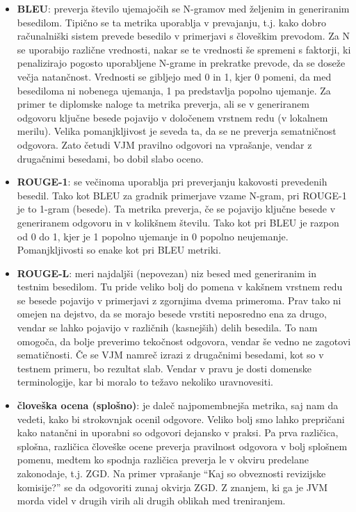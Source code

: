 \documentclass[a4paper,12pt,openright]{book}
\begin{document}
\begin{itemize}
    \item \textbf{BLEU}: preverja število ujemajočih se N-gramov med željenim in generiranim besedilom. Tipično se ta metrika uporablja v prevajanju, t.j. kako dobro računalniški sistem prevede besedilo v primerjavi s človeškim prevodom. Za N se uporabijo različne vrednosti, nakar se te vrednosti še spremeni s faktorji, ki penalizirajo pogosto uporabljene N-grame in prekratke prevode, da se doseže večja natančnost. Vrednosti se gibljejo med 0 in 1, kjer 0 pomeni, da med besediloma ni nobenega ujemanja, 1 pa predstavlja popolno ujemanje. Za primer te diplomske naloge ta metrika preverja, ali se v generiranem odgovoru ključne besede pojavijo v določenem vrstnem redu (v lokalnem merilu). Velika pomanjkljivost je seveda ta, da se ne preverja sematničnost odgovora. Zato četudi VJM pravilno odgovori na vprašanje, vendar z drugačnimi besedami, bo dobil slabo oceno.
    \item \textbf{ROUGE-1}: se večinoma uporablja pri preverjanju kakovosti prevedenih besedil. Tako kot BLEU za gradnik primerjave vzame N-gram, pri ROUGE-1 je to 1-gram (besede). Ta metrika preverja, če se pojavijo ključne besede v generiranem odgovoru in v kolikšnem številu. Tako kot pri BLEU je razpon od 0 do 1, kjer je 1 popolno ujemanje in 0 popolno neujemanje. Pomanjkljivosti so enake kot pri BLEU metriki.
    \item \textbf{ROUGE-L}: meri najdaljši (nepovezan) niz besed med generiranim in testnim besedilom. Tu pride veliko bolj do pomena v kakšnem vrstnem redu se besede pojavijo v primerjavi z zgornjima dvema primeroma. Prav tako ni omejen na dejstvo, da se morajo besede vrstiti neposredno ena za drugo, vendar se lahko pojavijo v različnih (kasnejših) delih besedila. To nam omogoča, da bolje preverimo tekočnost odgovora, vendar še vedno ne zagotovi sematičnosti. Če se VJM namreč izrazi z drugačnimi besedami, kot so v testnem primeru, bo rezultat slab. Vendar v pravu je dosti domenske terminologije, kar bi moralo to težavo nekoliko uravnovesiti.
    \item \textbf{človeška ocena (splošno)}: je daleč najpomembnejša metrika, saj nam da vedeti, kako bi strokovnjak ocenil odgovore. Veliko bolj smo lahko prepričani kako natančni in uporabni so odgovori dejansko v praksi. Pa prva različica, splošna, različica človeške ocene preverja pravilnost odgovora v bolj splošnem pomenu, medtem ko spodnja različica preverja le v okviru predelane zakonodaje, t.j. ZGD. Na primer vprašanje “Kaj so obveznosti revizijske komisije?” se da odgovoriti zunaj okvirja ZGD. Z znanjem, ki ga je JVM morda videl v drugih virih ali drugih oblikah med treniranjem.

\end{itemize}
\end{document}
